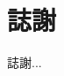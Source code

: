 \documentclass[class=NCU_thesis, crop=false]{standalone}
\begin{document}
\chapter{誌謝}

誌謝...
\end{document}
